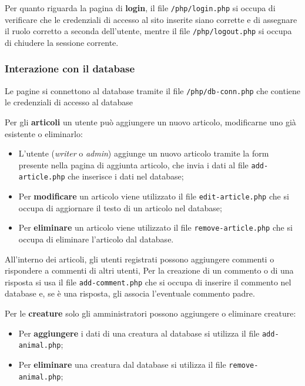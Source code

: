 Per quanto riguarda la pagina di \textbf{login}, il file \texttt{/php/login.php} si occupa di verificare che le credenziali di accesso al sito inserite siano corrette
e di assegnare il ruolo corretto a seconda dell'utente, mentre il file \texttt{/php/logout.php} si occupa di chiudere la sessione corrente.

\subsubsection{Interazione con il database}
Le pagine si connettono al database tramite il file \texttt{/php/db-conn.php} che contiene le credenziali di accesso al database

Per gli \textbf{articoli} un utente può aggiungere un nuovo articolo, modificarne uno già esistente o eliminarlo:
\begin{itemize}
    \item L'utente (\textit{writer} o \textit{admin}) aggiunge un nuovo articolo tramite la form presente nella pagina di aggiunta articolo, che invia i dati al file \texttt{add-article.php} che inserisce i dati nel database;
    \item Per \textbf{modificare} un articolo viene utilizzato il file \texttt{edit-article.php} che si occupa di aggiornare il testo di un articolo nel database;
    \item Per \textbf{eliminare} un articolo viene utilizzato il file \texttt{remove-article.php} che si occupa di eliminare l'articolo dal database.
\end{itemize}

All'interno dei articoli, gli utenti registrati possono aggiungere commenti o rispondere a commenti di altri utenti,
Per la creazione di un commento o di una risposta si usa il file \texttt{add-comment.php} che si occupa di inserire il commento nel database
e, se è una risposta, gli associa l'eventuale commento padre.

Per le \textbf{creature} solo gli amministratori possono aggiungere o eliminare creature:

\begin{itemize}
    \item Per \textbf{aggiungere} i dati di una creatura al database si utilizza il file \texttt{add-animal.php};
    \item Per \textbf{eliminare} una creatura dal database si utilizza il file \texttt{remove-animal.php};
\end{itemize}

